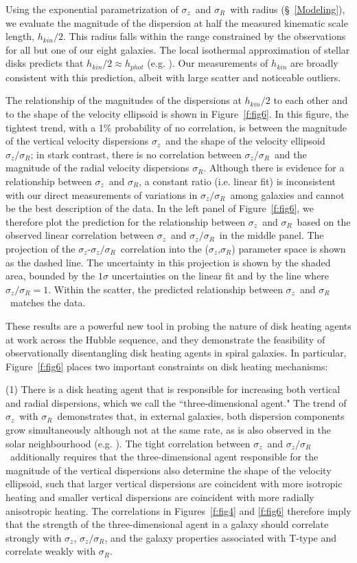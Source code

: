 \documentclass[useAMS,usenatbib]{mn2e}
\newcommand{\sz}{$\sigma_z$}
\newcommand{\sr}{$\sigma_R$}
\newcommand{\szsr}{$\sigma_z/\sigma_R$}
\begin{document}
Using the exponential parametrization of \sz\ and \sr\ with
radius (\S~\ref{Modeling}), we evaluate the magnitude of the
dispersion at half the measured kinematic scale length, $h_{kin}/2$.
This radius falls within the range constrained by the observations for
all but one of our eight galaxies.  The local isothermal approximation
of stellar disks predicts that $h_{kin}/2 \approx h_{phot}$
(e.g. \citealp{vdk1986, Martinsson2011}).  Our measurements of $h_{kin}$ are broadly
consistent with this prediction, albeit with large scatter and
noticeable outliers.

The relationship of the magnitudes of the dispersions at $h_{kin}/2$ to each
other and to the shape of the velocity ellipsoid is shown in
Figure~\ref{f:fig6}.  In this figure, the tightest trend, with a 1\%
probability of no correlation, is between the magnitude of the vertical
velocity dispersions \sz\ and the shape of the velocity ellipsoid \szsr;
in stark contrast, there is no correlation between \szsr\ and the
magnitude of the radial velocity dispersions \sr.
%
Although there is evidence for a relationship between \sz\ and \sr, a
constant ratio (i.e. linear fit) is inconsistent with our direct
measurements of variations in \szsr\ among galaxies and cannot be the
best description of the data.  In the left panel of Figure~\ref{f:fig6},
we therefore plot the prediction for the relationship between \sz\ and
\sr\ based on the observed linear correlation between \sz\ and \szsr\ in the
middle panel.  The projection of the \sz-\szsr\ correlation into the (\sz,\sr)
parameter space is shown as the dashed line.  The uncertainty in this
projection is shown by the shaded area, bounded by the
$1\sigma$ uncertainties on the linear fit and by the line where
\szsr$=1$.  Within the scatter, the predicted relationship between
\sz\ and \sr\ matches the data.

These results are a powerful new tool in probing the nature of disk
heating agents at work across the Hubble sequence, and they demonstrate
the feasibility of observationally disentangling disk heating agents in
spiral galaxies.  In particular, Figure~\ref{f:fig6} places two
important constraints on disk heating mechanisms:

(1) There is a disk heating agent that is responsible for increasing
both vertical and radial dispersions, which we call the
``three-dimensional agent."  The trend of \sz\ with \sr\ demonstrates
that, in external galaxies, both dispersion components grow
simultaneously although not at the same rate, as is also observed in the
solar neighbourhood (e.g. \citealt{Holmberg2007}).  The tight correlation
between \sz\ and \szsr\ additionally requires that the three-dimensional
agent responsible for the magnitude of the vertical dispersions also
determine the shape of the velocity ellipsoid, such that larger vertical
dispersions are coincident with more isotropic heating and smaller
vertical dispersions are coincident with more radially anisotropic
heating.  The correlations in Figures~\ref{f:fig4} and \ref{f:fig6}
therefore imply that the strength of the three-dimensional
agent in a galaxy should correlate strongly with \sz, \szsr, and the
galaxy properties associated with T-type and correlate weakly with \sr.
\end{document}
